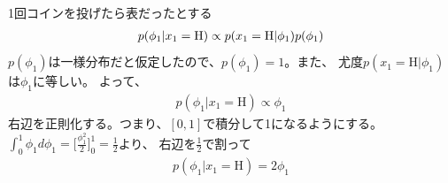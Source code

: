 \documentclass[aspectratio=169,unicode,dvipdfmx,14pt]{beamer}
\begin{document}
\begin{frame}{1回コインを投げたら表だったとする}
\vspace{-.3in}
\begin{align}
p(\phi_1 | x_1 = \mbox{H}) \propto p(x_1 = \mbox{H} | \phi_1) p(\phi_1)
\notag
\end{align}
$p(\phi_1)$は一様分布だと仮定したので、$p(\phi_1)=1$。また、
尤度$p(x_1 = \mbox{H} | \phi_1)$は$\phi_1$に等しい。
よって、
\begin{align}
p(\phi_1 | x_1 = \mbox{H}) \propto \phi_1
\end{align}
右辺を正則化する。つまり、$[0,1]$で積分して1になるようにする。
$\int_0^1 \phi_1 d\phi_1 = \Big[ \frac{\phi_1^2}{2} \Big]_0^1 = \frac{1}{2}$より、
右辺を$\frac{1}{2}$で割って
\begin{align}
p(\phi_1 | x_1 = \mbox{H}) = 2\phi_1
\end{align}
\end{frame}
\end{document}
